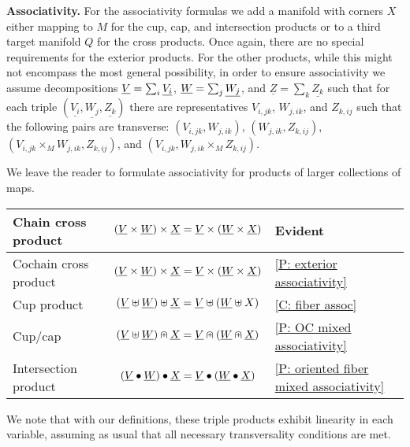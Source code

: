 \bigskip

\textbf{Associativity.}
For the associativity formulas we add a manifold with corners $X$ either mapping to $M$ for the cup, cap, and intersection products or to a third target manifold $Q$ for the cross products. Once again, there are no special requirements for the exterior products. For the other products, while this might not encompass the most general possibility, in order to ensure associativity we assume decompositions  $\underline{V}=\sum_i \underline{V_i}$, $\underline{W}=\sum_j \underline{W_j}$, and  $\underline{Z}=\sum_k \underline{Z_k}$ such that for each triple $(\underline{V_i},\underline{W_j}, \underline{Z_k})$ there are representatives $V_{i,jk}$, $W_{j,ik}$, and $Z_{k,ij}$ such that the following pairs are transverse: $(V_{i,jk}, W_{j,ik})$, $(W_{j,ik},Z_{k,ij})$, $(V_{i,jk}\times_M W_{j,ik},Z_{k,ij})$, and $(V_{i,jk}, W_{j,ik}\times_M Z_{k,ij})$.

We leave the reader to formulate associativity for products of larger collections of maps. 


\bigskip

\begin{minipage}{\linewidth}
\centering





\begin{tabular}{|l|c|l|}
\hline
Chain cross product& $(\underline{V}\times \underline{W})\times \underline{X}=\underline{V}\times (\underline{W}\times \underline{X})$&Evident\\
\hline
Cochain cross product& $(\underline{V}\times \underline{W})\times \underline{X}=\underline{V}\times (\underline{W}\times \underline{X})$&\cref{P: exterior associativity}\\
\hline
Cup product &$(\underline{V}\uplus \underline{W})\uplus\underline{X}=\underline{V}\uplus(\underline{W}\uplus X)$&\cref{C: fiber assoc} \\
\hline
Cup/cap & $(\underline{V} \uplus \underline{W})\nplus \underline{X}=\underline{V}\nplus(\underline{W}\nplus\underline{X})$& \cref{P: OC mixed associativity}\\
\hline
Intersection product &
$(\underline{V}\bullet\underline{W})\bullet\underline{X}=\underline{V}\bullet(\underline{W}\bullet \underline{X})$&\cref{P: oriented fiber mixed associativity}\\
\hline
\end{tabular}
\end{minipage}

\bigskip

We note that with our definitions, these triple products exhibit linearity in each variable, assuming as usual that all necessary transversality conditions are met. 




